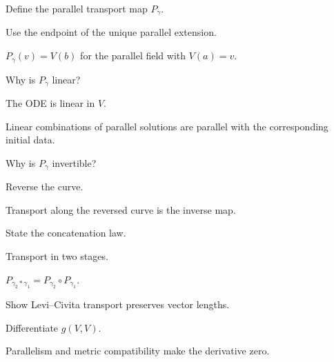 \begin{exercise}\label{exr:vii24-04}
Define the parallel transport map \(P_\gamma\).
\end{exercise}
\begin{hint}
Use the endpoint of the unique parallel extension.
\end{hint}
\begin{solution}
\(P_\gamma(v)=V(b)\) for the parallel field with \(V(a)=v\).
\end{solution}


\begin{exercise}\label{exr:vii24-05}
Why is \(P_\gamma\) linear?
\end{exercise}
\begin{hint}
The ODE is linear in \(V\).
\end{hint}
\begin{solution}
Linear combinations of parallel solutions are parallel with the corresponding initial data.
\end{solution}


\begin{exercise}\label{exr:vii24-06}
Why is \(P_\gamma\) invertible?
\end{exercise}
\begin{hint}
Reverse the curve.
\end{hint}
\begin{solution}
Transport along the reversed curve is the inverse map.
\end{solution}


\begin{exercise}\label{exr:vii24-07}
State the concatenation law.
\end{exercise}
\begin{hint}
Transport in two stages.
\end{hint}
\begin{solution}
\(P_{\gamma_2*\gamma_1}=P_{\gamma_2}\circ P_{\gamma_1}\).
\end{solution}


\begin{exercise}\label{exr:vii24-08}
Show Levi--Civita transport preserves vector lengths.
\end{exercise}
\begin{hint}
Differentiate \(g(V,V)\).
\end{hint}
\begin{solution}
Parallelism and metric compatibility make the derivative zero.
\end{solution}


